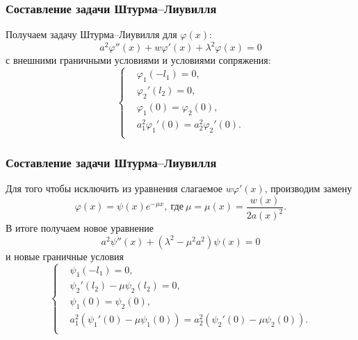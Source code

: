 \documentclass[10pt,pdf,hyperref={unicode}]{beamer}
\begin{document}
\begin{frame}
  \frametitle{Составление задачи Штурма--Лиувилля}
  Получаем задачу Штурма--Лиувилля для $\varphi(x)$:
  \begin{equation*}
    a^2 \varphi''(x) + w \varphi'(x) + \lambda^2\varphi(x)=0 
  \end{equation*}
  с внешними граничными условиями и условиями сопряжения:
  \begin{equation*}
    \left\{
    \begin{aligned}
      & \varphi_1(-l_1) = 0, \\
      & \varphi_2'(l_2) = 0, \\
      & \varphi_1(0) = \varphi_2(0), \\
      & a_1^2 \varphi_1'(0) = a_2^2 \varphi_2'(0). \\
    \end{aligned}
    \right.
  \end{equation*}
\end{frame}

\begin{frame}
  \frametitle{Составление задачи Штурма--Лиувилля}
  Для того чтобы исключить из уравнения слагаемое $w\varphi'(x)$, производим замену 
  \begin{equation*}
    \varphi(x) = \psi(x) e^{- \mu x},\ \text{где}\ \mu=\mu(x) = \frac{w(x)}{2a(x)^2}.
  \end{equation*}
  В итоге получаем новое уравнение
  \begin{equation*}
    a^2\psi''(x) + (\lambda^2 - \mu^2a^2) \psi(x) = 0
    \label{eq:3}
  \end{equation*}
  и новые граничные условия
  \begin{equation*}
    \left\{
    \begin{aligned}
      & \psi_1(-l_1) = 0, \\
      & \psi_2'(l_2) - \mu\psi_2(l_2) = 0, \\
      & \psi_1(0) = \psi_2(0), \\
      & a_1^2(\psi_1'(0) - \mu\psi_1(0)) =  a_2^2(\psi_2'(0) - \mu\psi_2(0)). \\
    \end{aligned}
    \right.
    \label{}
  \end{equation*}
\end{frame}
\end{document}
